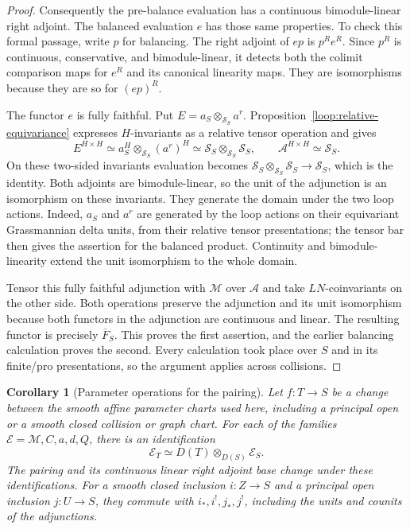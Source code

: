 \documentclass[11pt]{article}
\numberwithin{equation}{section}
\newtheorem{corollary}[theorem]{Corollary}
\theoremstyle{definition}
\theoremstyle{remark}
\begin{document}
\begin{proof}
Consequently the pre-balance evaluation has a continuous
bimodule-linear right adjoint.  The balanced evaluation $e$
has those same properties.  To check this formal passage,
write $p$ for balancing.  The right adjoint of $ep$ is
$p^Re^R$.  Since $p^R$ is continuous, conservative, and
bimodule-linear, it detects both the colimit comparison maps
for $e^R$ and its canonical linearity maps.  They are
isomorphisms because they are so for $(ep)^R$.

The functor $e$ is fully faithful.  Put
$E=a_S\otimes_{\mathcal S_S}a^r$.  Proposition~\ref{loop:relative-equivariance}
expresses $H$-invariants as a relative tensor operation and gives
\[
 E^{H\times H}\simeq
    a_S^H\otimes_{\mathcal S_S}(a^r)^H
       \simeq\mathcal S_S\otimes_{\mathcal S_S}\mathcal S_S,
 \qquad \mathcal A^{H\times H}\simeq\mathcal S_S.
\]
On these two-sided invariants evaluation becomes
$\mathcal S_S\otimes_{\mathcal S_S}\mathcal S_S\to\mathcal S_S$,
which is the identity.  Both adjoints are bimodule-linear,
so the unit of the adjunction is an isomorphism on these
invariants.  They generate the domain under the two loop
actions.  Indeed, $a_S$ and $a^r$ are generated by the loop
actions on their equivariant Grassmannian delta units, from
their relative tensor presentations; the tensor bar then
gives the assertion for the balanced product.  Continuity
and bimodule-linearity extend the unit isomorphism to the
whole domain.

Tensor this fully faithful adjunction with $\mathcal M$ over
$\mathcal A$ and take $LN$-coinvariants on the other side.
Both operations preserve the adjunction and its unit
isomorphism because both functors in the adjunction are
continuous and linear.  The resulting functor is precisely
$\overline F_S$.  This proves the first assertion, and the
earlier balancing calculation proves the second.  Every
calculation took place over $S$ and in its finite/pro
presentations, so the argument applies across collisions.
\end{proof}

\begin{corollary}[Parameter operations for the pairing]
\label{loop:parameter-operations}
Let $f:T\to S$ be a change between the smooth affine parameter charts
used here, including a principal open or a smooth closed collision or
graph chart.  For each of the families
$\mathcal E=\mathcal M,C,a,d,Q$, there is an identification
\[
             \mathcal E_T\simeq
                   D(T)\otimes_{D(S)}\mathcal E_S.
\]
The pairing and its continuous linear right adjoint base change under
these identifications.  For a smooth closed inclusion $i:Z\to S$ and a
principal open inclusion $j:U\to S$, they commute with
$i_*,i^!,j_*,j^!$, including the units and counits of the adjunctions.
\end{corollary}
\end{document}

